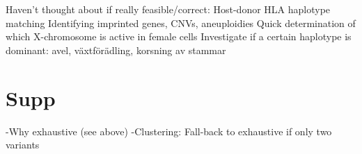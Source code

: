 Haven't thought about if really feasible/correct:
Host-donor HLA haplotype matching
Identifying imprinted genes, CNVs, aneuploidies
Quick determination of which X-chromosome is active in female cells
Investigate if a certain haplotype is dominant: avel, växtförädling, korsning av stammar

\section{Supp}
-Why exhaustive (see above)
-Clustering: Fall-back to exhaustive if only two variants

